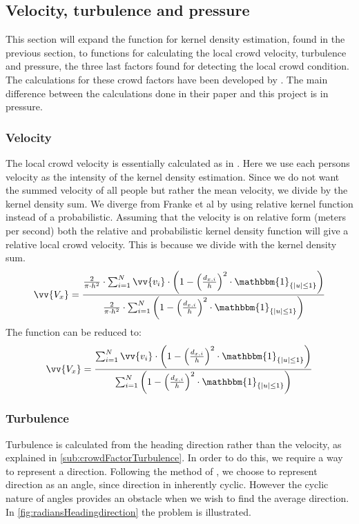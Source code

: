 
\subsection{Velocity, turbulence and pressure}
This section will expand the function for kernel density estimation, found in the previous section, to functions for calculating the local crowd velocity, turbulence and pressure, the three last factors found for detecting the local crowd condition. The calculations for these crowd factors have been developed by \citet{wirz2012inferring}. The main difference between the calculations done in their paper and this project is in pressure. 

\subsubsection{Velocity}
The local crowd velocity is essentially calculated as in \citet{wirz2012inferring}. Here we use each persons velocity as the intensity of the kernel density estimation. Since we do not want the summed velocity of all people but rather the mean velocity, we divide by the kernel density sum. We diverge from Franke et al by using relative kernel function instead of a probabilistic. Assuming that the velocity is on relative form (meters per second) both the relative and probabilistic kernel density function will give a relative local crowd velocity. This is because we divide with the kernel density sum. 
\begin{equation}
\label{eq:}
\vv{V_x} = \frac{\frac{2}{\pi \cdot h^2} \cdot \sum_{i=1}^N \vv{v_i} \cdot \left(1-\left(\frac{d_{x,i}}{h}\right)^2 \cdot \mathbbm{1}_{\{|u| \leq 1\} }\right)}{\frac{2}{\pi \cdot h^2} \cdot \sum_{i=1}^N \left(1-\left(\frac{d_{x,i}}{h}\right)^2 \cdot \mathbbm{1}_{\{|u| \leq 1\} }\right)}
\end{equation}
The function can be reduced to:
\begin{equation}
\label{eq:}
\vv{V_x} = \frac{\sum_{i=1}^N \vv{v_i} \cdot \left(1-\left(\frac{d_{x,i}}{h}\right)^2 \cdot \mathbbm{1}_{\{|u| \leq 1\} }\right)}{\sum_{i=1}^N \left(1-\left(\frac{d_{x,i}}{h}\right)^2 \cdot \mathbbm{1}_{\{|u| \leq 1\} }\right)}
\end{equation}

\subsubsection{Turbulence}
Turbulence is calculated from the heading direction rather than the velocity, as explained in \cref{sub:crowdFactorTurbulence}. In order to do this, we require a way to represent a direction. Following the method of \citet{localTrendStatistics}, we choose to represent direction as an angle, since direction in inherently cyclic. However the cyclic nature of angles provides an obstacle when we wish to find the average direction. In \cref{fig:radiansHeadingdirection} the problem is illustrated.


